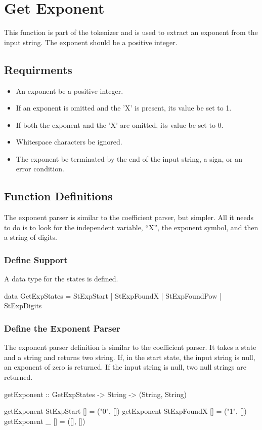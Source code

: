 \section{Get Exponent}
This function is part of the tokenizer and is used to extract an exponent from the input string.  The exponent should be a positive integer.
\subsection{Requirments}
\begin{itemize}
\item An exponent  be a positive integer.
\item If an exponent is omitted and the 'X' is present, its value  be set to 1.
\item If both the exponent and the 'X' are omitted, its value  be set to 0.
\item Whitespace characters  be ignored.
\item The exponent  be terminated by the end of the input string, a sign, or an error condition.
\end{itemize}

\subsection{Function Definitions}
The exponent parser is similar to the coefficient parser, but simpler.  All it needs to do is to look for the independent variable, ``X'', the exponent symbol, and then a string of digits.
\subsubsection{Define Support}
A data type for the states is defined.
\begin{code}
data GetExpStates = StExpStart | StExpFoundX | StExpFoundPow | StExpDigits
\end{code}
\subsubsection{Define the Exponent Parser}
The exponent parser definition is similar to the coefficient parser.  It takes a state and a string and returns two string.  If, in the start state, the input string is null, an exponent of zero is returned.  If the input string is null, two null strings are returned.
\begin{code}
getExponent :: GetExpStates -> String -> (String, String)

getExponent StExpStart [] = ("0", [])
getExponent StExpFoundX [] = ("1", [])
getExponent _ [] = ([], [])
\end{code}
